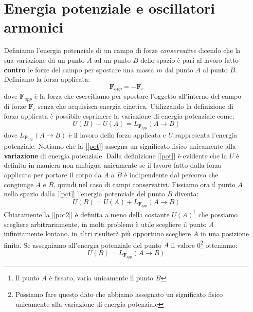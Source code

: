\documentclass[a4paper,10pt,oneside]{article}
\begin{document}
\section*{Energia potenziale  e oscillatori armonici}

\vspace{1cm}

Definiamo  l'energia potenziale di un  campo di forze \emph{conservative} dicendo che la sua variazione da un punto $A$ ad un punto $B$ dello spazio è pari al lavoro fatto \textbf{contro} le forze del campo per spostare una massa $m$ dal punto $A$ al punto $B$.
Definiamo la forza applicata:
\begin{equation}
 \mathbf{F}_{app}=-\mathbf{F}_c
\end{equation}
dove $\mathbf{F}_{app}$ è la forza che esercitiamo per spostare l'oggetto all'interno del campo di forze $\mathbf{F}_c$ senza che acquisisca energia cinetica. Utilizzando la definizione di forza applicata è possibile esprimere la variazione di energia potenziale come:
\begin{equation}\label{pot}
U(B)-U(A)=L_{\mathbf{F}_{app}}(A\to B)
\end{equation}
dove $L_{\mathbf{F}_{app}}(A\to B)$ è il lavoro della forza applicata e $U$ rappresenta l'energia potenziale. Notiamo che la [\ref{pot}] assegna un significato fisico unicamente alla \textbf{variazione} di energia potenziale. Dalla definizione [\ref{pot}] è evidente che la $U$ è definita in maniera non ambigua unicamente se il lavoro fatto dalla forza applicata per portare il corpo da $A$ a $B$ è indipendente dal percorso che congiunge $A$ e $B$,  quindi nel caso di campi conservativi.
Fissiamo ora il punto $A$ nello spazio dalla [\ref{pot}] l'energia potenziale del punto $B$ diventa:
\begin{equation}\label{pot2}
 U(B)=U(A)+L_{\mathbf{F}_{app}}(A\to B)
\end{equation}
Chiaramente la [\ref{pot2}] è definita a meno della costante $U(A)$\footnote{Il punto $A$ è fissato, varia unicamente il punto $B$} che possiamo scegliere arbitrariamente, in molti problemi è utile scegliere il punto $A$ infinitamente lontano, in altri risulterà più  opportuno scegliere $A$ in una posizione finita. Se assegniamo all'energia potenziale del punto $A$ il valore 0\footnote{Possiamo fare questo dato che  abbiamo assegnato un significato fisico unicamente alla variazione di energia potenziale} otteniamo:
\begin{equation}\label{pot3}
 U(B)=L_{\mathbf{F}_{app}}(A\to B)
\end{equation}
\end{document}
